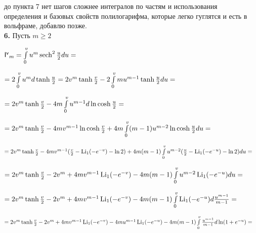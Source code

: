 \documentclass[a4paper,12pt]{article}
\begin{document}
 до пункта 7 нет шагов сложнее интегралов по частям и использования определения и базовых свойств полилогарифма, которые легко гуглятся и есть в вольфраме, добавлю позже.\\

\noindent\textbf{6.} Пусть $m \geq{2}$

\begin{center}
    $\mathsf{I^{v}}_m = \int\limits_0^{v} u^m \operatorname{sech}^2{u\over{2}} d u =$
\end{center}

\begin{center}
    $= 2\int\limits_{0}^v u^m d\operatorname{tanh}{u\over{2}} = 2v^m \operatorname{tanh}{v\over{2}} - 2\int\limits_0^v m u^{m - 1} \operatorname{tanh}{u\over{2}}d u = $
\end{center}

\begin{center}
    $= 2v^m \operatorname{tanh}{v\over{2}} - 4 m \int\limits_0^v u^{m - 1} d \ln{\operatorname{cosh}{u\over{2}}} =$
\end{center}

\begin{center}
    $= 2v^m \operatorname{tanh}{v\over{2}} - 4 m v^{m - 1} \ln{\operatorname{cosh}{v\over{2}}} + 4m\int\limits_0^v (m - 1) u^{m - 2} \ln{\operatorname{cosh}{u\over{2}}} d u  =$
\end{center}

\begin{center}
    $= 2v^m \operatorname{tanh}{v\over{2}} - 4 m v^{m - 1}({v\over{2}} - \operatorname{Li_1}(-e^{-v}) - \ln{2}) + 4m(m - 1) \int\limits_0^v u^{m - 2} ({u\over{2}} - \operatorname{Li_1}(-e^{-u}) - \ln{2}) d u  =$
\end{center}

\begin{center}
    $= 2v^m \operatorname{tanh}{v\over{2}} - 2v^m + 4m v^{m - 1}\operatorname{Li_1}(-e^{-v}) - 4m(m - 1) \int\limits_0^v u^{m - 2} \operatorname{Li_1}(-e^{-u}) d u  =$
\end{center}

\begin{center}
    $= 2v^m \operatorname{tanh}{v\over{2}} - 2v^m + 4m v^{m - 1}\operatorname{Li_1}(-e^{-v}) - 4m(m - 1) \int\limits_0^v \operatorname{Li_1}(-e^{-u}) d {u^{m - 1}\over{m - 1}}  =$
\end{center}

\begin{center}
    $= 2v^m \operatorname{tanh}{v\over{2}} - 2v^m + 4m v^{m - 1}\operatorname{Li_1}(-e^{-v}) - 4m u^{m - 1}\operatorname{Li_1}(-e^{-u}) - 4m(m - 1)\int\limits_0^v {u^{m - 1}\over{m - 1}} d\ln(1 + e^{-u}) =$
\end{center}
\end{document}
